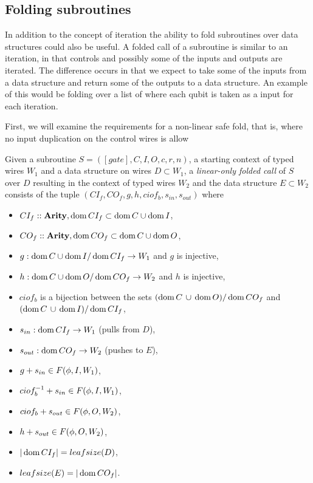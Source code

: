 \subsection{Folding subroutines} %
\label{sub:folding_subroutines}

In addition to the concept of iteration the ability to fold subroutines over data structures could
also be useful. A folded call of a subroutine is similar to an iteration, in that controls and
possibly some of the inputs and outputs are iterated. The difference occurs in that we expect to
take some of the inputs from a data structure and return some of the outputs to a data structure.
An example of this would be folding over a list of  where each qubit is taken as a input
for each iteration.

First, we will examine the requirements for a non-linear safe fold, that is, where no input
duplication on the control wires is allow

\begin{definition}\label{def:linear_only_subroutine_fold}
  Given a subroutine $S=([gate],C,I,O,c,r,n)$, a starting context of typed wires $W_1$ and a data
  structure on wires $D\subset W_1$, a \emph{linear-only folded call} of $S$ over $D$ resulting in
  the context of typed wires $W_2$ and the data structure $E\subset W_2$ consists of the tuple
  $(CI_f,CO_f, g, h, ciof_b, s_{in}, s_{out})$ where
  \begin{itemize}
    \item $CI_f::\mathbf{{Arity}}, \operatorname*{dom}{CI_f} \subset \operatorname*{dom}{C}\cup \operatorname*{dom}{I}$,
    \item $CO_f::\mathbf{{Arity}}, \operatorname*{dom}{CO_f} \subset \operatorname*{dom}{C}\cup \operatorname*{dom}{O}$,
    \item $g:\operatorname*{dom}{C}\cup\operatorname*{dom} I / \operatorname*{dom}{CI_f} \to W_1$ and $g$ is injective,
    \item $h:\operatorname*{dom}{C}\cup\operatorname*{dom} O /\operatorname*{dom}{CO_f} \to W_2$ and $h$ is injective,
    \item $ciof_b$ is a bijection between the sets $(\operatorname*{dom}{C}\,\cup\,\operatorname*{dom}{O})/\operatorname*{dom}{CO_f}$
      and $(\operatorname*{dom}{C}\,\cup\,\operatorname*{dom}{I})/\operatorname*{dom}{CI_f}$,
    \item $s_{in}: \operatorname*{dom}{CI_f} \to W_1$ (pulls from $D$),
    \item $s_{out}: \operatorname*{dom}{CO_f} \to W_2$ (pushes to $E$),
    \item $g + s_{in} \in F(\phi,I,W_1)$,
    \item $ciof_b^{-1} + s_{in} \in F(\phi,I,W_1)$,
    \item $ciof_b + s_{out} \in F(\phi,O,W_2)$,
    \item $h + s_{out} \in F(\phi,O,W_2)$,
    \item $|\operatorname*{dom}{CI_f}| = leafsize(D)$,
    \item $leafsize(E) = |\operatorname*{dom}{CO_f}|$.
  \end{itemize}
\end{definition}

